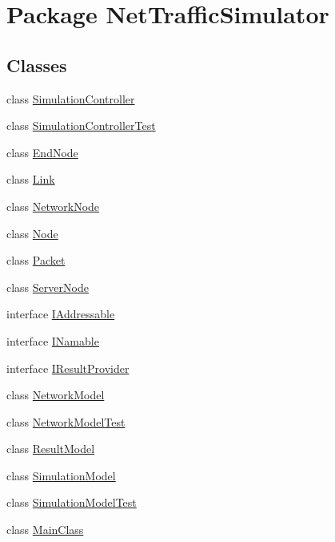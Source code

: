 \hypertarget{namespaceNetTrafficSimulator}{\section{Package Net\-Traffic\-Simulator}
\label{namespaceNetTrafficSimulator}
}
\subsection*{Classes}
\begin{DoxyCompactItemize}
\item 
class \hyperlink{classNetTrafficSimulator_1_1SimulationController}{Simulation\-Controller}
\item 
class \hyperlink{classNetTrafficSimulator_1_1SimulationControllerTest}{Simulation\-Controller\-Test}
\item 
class \hyperlink{classNetTrafficSimulator_1_1EndNode}{End\-Node}
\item 
class \hyperlink{classNetTrafficSimulator_1_1Link}{Link}
\item 
class \hyperlink{classNetTrafficSimulator_1_1NetworkNode}{Network\-Node}
\item 
class \hyperlink{classNetTrafficSimulator_1_1Node}{Node}
\item 
class \hyperlink{classNetTrafficSimulator_1_1Packet}{Packet}
\item 
class \hyperlink{classNetTrafficSimulator_1_1ServerNode}{Server\-Node}
\item 
interface \hyperlink{interfaceNetTrafficSimulator_1_1IAddressable}{I\-Addressable}
\item 
interface \hyperlink{interfaceNetTrafficSimulator_1_1INamable}{I\-Namable}
\item 
interface \hyperlink{interfaceNetTrafficSimulator_1_1IResultProvider}{I\-Result\-Provider}
\item 
class \hyperlink{classNetTrafficSimulator_1_1NetworkModel}{Network\-Model}
\item 
class \hyperlink{classNetTrafficSimulator_1_1NetworkModelTest}{Network\-Model\-Test}
\item 
class \hyperlink{classNetTrafficSimulator_1_1ResultModel}{Result\-Model}
\item 
class \hyperlink{classNetTrafficSimulator_1_1SimulationModel}{Simulation\-Model}
\item 
class \hyperlink{classNetTrafficSimulator_1_1SimulationModelTest}{Simulation\-Model\-Test}
\item 
class \hyperlink{classNetTrafficSimulator_1_1MainClass}{Main\-Class}
\end{DoxyCompactItemize}
